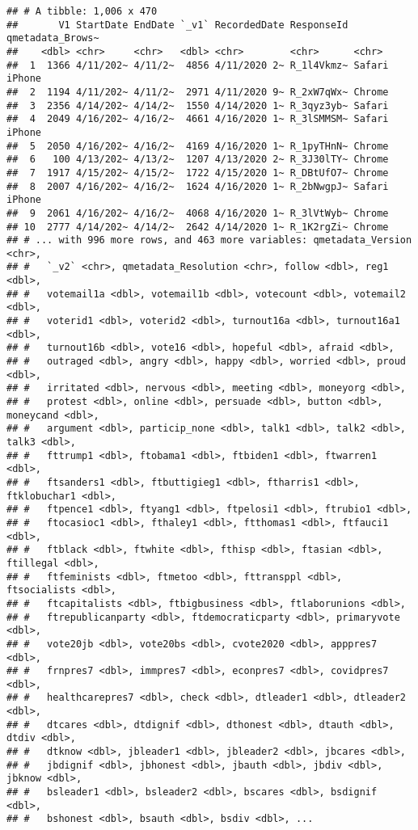 \documentclass[
]{article}
\begin{document}
\begin{verbatim}
## # A tibble: 1,006 x 470
##       V1 StartDate EndDate `_v1` RecordedDate ResponseId qmetadata_Brows~
##    <dbl> <chr>     <chr>   <dbl> <chr>        <chr>      <chr>           
##  1  1366 4/11/202~ 4/11/2~  4856 4/11/2020 2~ R_1l4Vkmz~ Safari iPhone   
##  2  1194 4/11/202~ 4/11/2~  2971 4/11/2020 9~ R_2xW7qWx~ Chrome          
##  3  2356 4/14/202~ 4/14/2~  1550 4/14/2020 1~ R_3qyz3yb~ Safari          
##  4  2049 4/16/202~ 4/16/2~  4661 4/16/2020 1~ R_3lSMMSM~ Safari iPhone   
##  5  2050 4/16/202~ 4/16/2~  4169 4/16/2020 1~ R_1pyTHnN~ Chrome          
##  6   100 4/13/202~ 4/13/2~  1207 4/13/2020 2~ R_3J30lTY~ Chrome          
##  7  1917 4/15/202~ 4/15/2~  1722 4/15/2020 1~ R_DBtUfO7~ Chrome          
##  8  2007 4/16/202~ 4/16/2~  1624 4/16/2020 1~ R_2bNwgpJ~ Safari iPhone   
##  9  2061 4/16/202~ 4/16/2~  4068 4/16/2020 1~ R_3lVtWyb~ Chrome          
## 10  2777 4/14/202~ 4/14/2~  2642 4/14/2020 1~ R_1K2rgZi~ Chrome          
## # ... with 996 more rows, and 463 more variables: qmetadata_Version <chr>,
## #   `_v2` <chr>, qmetadata_Resolution <chr>, follow <dbl>, reg1 <dbl>,
## #   votemail1a <dbl>, votemail1b <dbl>, votecount <dbl>, votemail2 <dbl>,
## #   voterid1 <dbl>, voterid2 <dbl>, turnout16a <dbl>, turnout16a1 <dbl>,
## #   turnout16b <dbl>, vote16 <dbl>, hopeful <dbl>, afraid <dbl>,
## #   outraged <dbl>, angry <dbl>, happy <dbl>, worried <dbl>, proud <dbl>,
## #   irritated <dbl>, nervous <dbl>, meeting <dbl>, moneyorg <dbl>,
## #   protest <dbl>, online <dbl>, persuade <dbl>, button <dbl>, moneycand <dbl>,
## #   argument <dbl>, particip_none <dbl>, talk1 <dbl>, talk2 <dbl>, talk3 <dbl>,
## #   fttrump1 <dbl>, ftobama1 <dbl>, ftbiden1 <dbl>, ftwarren1 <dbl>,
## #   ftsanders1 <dbl>, ftbuttigieg1 <dbl>, ftharris1 <dbl>, ftklobuchar1 <dbl>,
## #   ftpence1 <dbl>, ftyang1 <dbl>, ftpelosi1 <dbl>, ftrubio1 <dbl>,
## #   ftocasioc1 <dbl>, fthaley1 <dbl>, ftthomas1 <dbl>, ftfauci1 <dbl>,
## #   ftblack <dbl>, ftwhite <dbl>, fthisp <dbl>, ftasian <dbl>, ftillegal <dbl>,
## #   ftfeminists <dbl>, ftmetoo <dbl>, fttransppl <dbl>, ftsocialists <dbl>,
## #   ftcapitalists <dbl>, ftbigbusiness <dbl>, ftlaborunions <dbl>,
## #   ftrepublicanparty <dbl>, ftdemocraticparty <dbl>, primaryvote <dbl>,
## #   vote20jb <dbl>, vote20bs <dbl>, cvote2020 <dbl>, apppres7 <dbl>,
## #   frnpres7 <dbl>, immpres7 <dbl>, econpres7 <dbl>, covidpres7 <dbl>,
## #   healthcarepres7 <dbl>, check <dbl>, dtleader1 <dbl>, dtleader2 <dbl>,
## #   dtcares <dbl>, dtdignif <dbl>, dthonest <dbl>, dtauth <dbl>, dtdiv <dbl>,
## #   dtknow <dbl>, jbleader1 <dbl>, jbleader2 <dbl>, jbcares <dbl>,
## #   jbdignif <dbl>, jbhonest <dbl>, jbauth <dbl>, jbdiv <dbl>, jbknow <dbl>,
## #   bsleader1 <dbl>, bsleader2 <dbl>, bscares <dbl>, bsdignif <dbl>,
## #   bshonest <dbl>, bsauth <dbl>, bsdiv <dbl>, ...
\end{verbatim}
\end{document}
